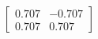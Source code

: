 \documentclass[preview]{standalone}
\begin{document}
\begin{align*}
\begin{bmatrix} 0.707 & -0.707 \\ 0.707 & 0.707 \end{bmatrix}
\end{align*}
\end{document}
